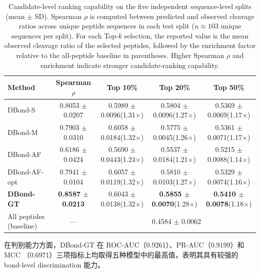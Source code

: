 \begin{table}[t]
\centering
\caption{Candidate-level ranking capability on the five independent
sequence-level splits (mean $\pm$ SD). Spearman $\rho$ is computed between
predicted and observed cleavage ratios across unique peptide sequences in
each test split ($n \approx 103$ unique sequences per split). For each
Top-$k$ selection, the reported value is the mean observed cleavage ratio
of the selected peptides, followed by the enrichment factor relative to the
all-peptide baseline in parentheses. Higher Spearman $\rho$ and enrichment
indicate stronger candidate-ranking capability.}
\label{tab:ranking}
\begin{tabular}{lcccc}
\toprule
Method        & Spearman $\rho$        & Top 10\%              & Top 20\%              & Top 50\%              \\
\midrule
DBond-S       & 0.8053 $\pm$ 0.0207   & 0.5989 $\pm$ 0.0096\;(1.31$\times$)  & 0.5804 $\pm$ 0.0096\;(1.27$\times$)  & 0.5369 $\pm$ 0.0069\;(1.17$\times$)  \\
DBond-M       & 0.7903 $\pm$ 0.0310   & 0.6058 $\pm$ 0.0184\;(1.32$\times$)  & 0.5775 $\pm$ 0.0045\;(1.26$\times$)  & 0.5361 $\pm$ 0.0071\;(1.17$\times$)  \\
DBond-AF      & 0.6186 $\pm$ 0.0424   & 0.5690 $\pm$ 0.0443\;(1.24$\times$)  & 0.5537 $\pm$ 0.0184\;(1.21$\times$)  & 0.5215 $\pm$ 0.0088\;(1.14$\times$)  \\
DBond-AF-opt  & 0.7941 $\pm$ 0.0104   & 0.6057 $\pm$ 0.0119\;(1.32$\times$)  & 0.5810 $\pm$ 0.0103\;(1.27$\times$)  & 0.5329 $\pm$ 0.0074\;(1.16$\times$)  \\
\midrule
\textbf{DBond-GT}
              & \textbf{0.8587 $\pm$ 0.0213}
              & 0.6043 $\pm$ 0.0138\;(1.32$\times$)
              & \textbf{0.5855 $\pm$ 0.0070}\;(1.28$\times$)
              & \textbf{0.5410 $\pm$ 0.0078}\;(1.18$\times$) \\
\midrule
All peptides (baseline)
              & ---
              & \multicolumn{3}{c}{0.4584 $\pm$ 0.0062} \\
\bottomrule
\end{tabular}
\end{table}

在判别能力方面，DBond-GT 在 ROC-AUC（0.9261）、PR-AUC（0.9199）和 MCC
（0.6971）三项指标上均取得五种模型中的最高值，表明其具有较强的 bond-level
discrimination 能力。

